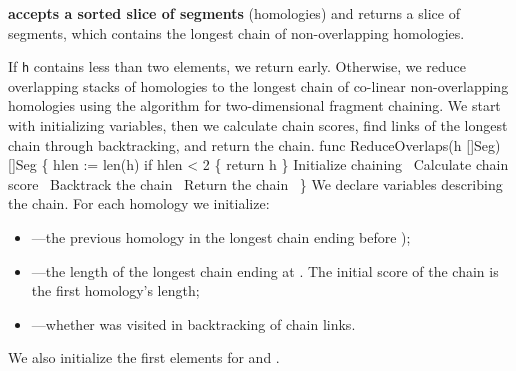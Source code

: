 \subsubsection{}
\textbf{ accepts a sorted slice of segments}
(homologies) and returns a slice of segments, which contains the
longest chain of non-overlapping homologies.

If \texttt{h} contains less than two elements, we return
early. Otherwise, we reduce overlapping stacks of homologies to the
longest chain of co-linear non-overlapping homologies using the
algorithm for two-dimensional fragment chaining. We start with
initializing variables, then we calculate chain scores, find links of
the longest chain through backtracking, and return the chain.
\nwenddocs{}\endmoddef\nwstartdeflinemarkup{}\nwenddeflinemarkup
func ReduceOverlaps(h []Seg) []Seg \{
          hlen := len(h)
          if hlen < 2 \{
                  return h
          \}
          \LA{}Initialize chaining~{\nwtagstyle{}}\RA{}
          \LA{}Calculate chain score~{\nwtagstyle{}}\RA{}
          \LA{}Backtrack the chain~{\nwtagstyle{}}\RA{}
          \LA{}Return the chain~{\nwtagstyle{}}\RA{}
\}
\nwendcode{}\nwdocspar
We declare variables describing the chain. For each homology  we
initialize:
\begin{itemize}
\itemsep0em
\item {}---the previous homology in the longest chain
  ending before );
\item {}---the length of the longest chain ending at
  . The initial score of the chain is the first
  homology's length;
\item {}---whether  was visited in backtracking of
  chain links.
\end{itemize}
We also initialize the first elements for  and
.
\nwenddocs{}\endmoddef\nwstartdeflinemarkup{}\nwenddeflinemarkup
